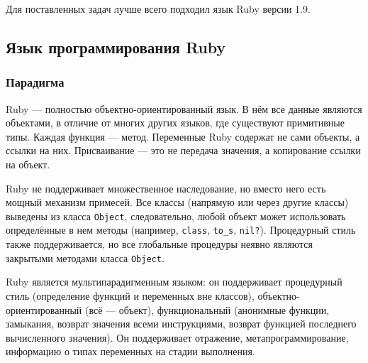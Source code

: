 \documentclass[utf8,a5paper,portrait,12pt]{eskdtext}
\begin{document}
Для поставленных задач лучше всего подходил язык Ruby версии 1.9.

\subsection{Язык программирования Ruby}

\subsubsection{Парадигма}

Ruby — полностью объектно-ориентированный язык. В нём все данные являются
объектами, в отличие от многих других языков, где существуют примитивные типы.
Каждая функция — метод. Переменные Ruby содержат не сами объекты, а ссылки на
них. Присваивание — это не передача значения, а копирование ссылки на
объект\cite{ruby}.

Ruby не поддерживает множественное наследование, но вместо него есть мощный
механизм примесей. Все классы (напрямую или через другие классы) выведены из
класса \texttt{Object}, следовательно, любой объект может использовать
определённые в нем методы (например, \texttt{class}, \texttt{to\_s},
\texttt{nil?}). Процедурный стиль также поддерживается, но все глобальные
процедуры неявно являются закрытыми методами класса \texttt{Object}.

Ruby является мультипарадигменным языком: он поддерживает процедурный стиль
(определение функций и переменных вне классов), объектно-ориентированный
(всё — объект), функциональный (анонимные функции, замыкания, возврат значения
всеми инструкциями, возврат функцией последнего вычисленного значения).
Он поддерживает отражение, метапрограммирование, информацию о типах переменных
на стадии выполнения.
\end{document}

